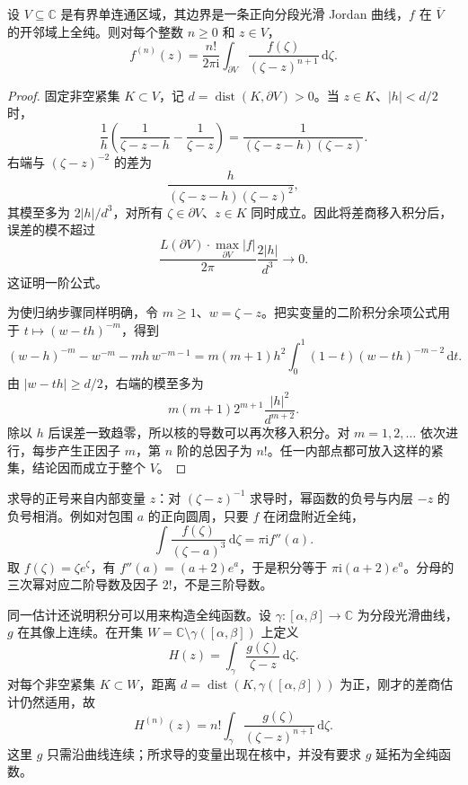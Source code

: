 \begin{proposition}\label{b3:prop:02-cauchy-derivatives}
设 \(V\subseteq\mathbb C\) 是有界单连通区域，其边界是一条正向分段光滑 Jordan 曲线，\(f\) 在 \(\overline V\) 的开邻域上全纯。则对每个整数 \(n\ge0\) 和 \(z\in V\)，
\[
 f^{(n)}(z)=\frac{n!}{2\pi\mathrm{i}}\int_{\partial V}
        \frac{f(\zeta)}{(\zeta-z)^{n+1}}\,\mathrm{d}\zeta.
\]
\end{proposition}
\begin{proof}
固定非空紧集 \(K\subset V\)，记 \(d=\operatorname{dist}(K,\partial V)>0\)。当 \(z\in K\)、\(|h|<d/2\) 时，
\[
 \frac1h\left(\frac1{\zeta-z-h}-\frac1{\zeta-z}\right)
 =\frac1{(\zeta-z-h)(\zeta-z)}.
\]
右端与 \((\zeta-z)^{-2}\) 的差为
\[
 \frac{h}{(\zeta-z-h)(\zeta-z)^2},
\]
其模至多为 \(2|h|/d^3\)，对所有 \(\zeta\in\partial V\)、\(z\in K\) 同时成立。因此将差商移入积分后，误差的模不超过
\[
 \frac{L(\partial V)\cdot\max_{\partial V}|f|}{2\pi}
       \frac{2|h|}{d^3}\longrightarrow0.
\]
这证明一阶公式。

为使归纳步骤同样明确，令 \(m\ge1\)、\(w=\zeta-z\)。把实变量的二阶积分余项公式用于 \(t\mapsto(w-th)^{-m}\)，得到
\[
 (w-h)^{-m}-w^{-m}-mh\,w^{-m-1}
 =m(m+1)h^2\int_0^1(1-t)(w-th)^{-m-2}\,\mathrm{d}t.
\]
由 \(|w-th|\ge d/2\)，右端的模至多为
\[
 m(m+1)2^{m+1}\frac{|h|^2}{d^{m+2}}.
\]
除以 \(h\) 后误差一致趋零，所以核的导数可以再次移入积分。对 \(m=1,2,\ldots\) 依次进行，每步产生正因子 \(m\)，第 \(n\) 阶的总因子为 \(n!\)。任一内部点都可放入这样的紧集，结论因而成立于整个 \(V\)。
\end{proof}

求导的正号来自内部变量 \(z\)：对 \((\zeta-z)^{-1}\) 求导时，幂函数的负号与内层 \(-z\) 的负号相消。例如对包围 \(a\) 的正向圆周，只要 \(f\) 在闭盘附近全纯，
\[
 \int\frac{f(\zeta)}{(\zeta-a)^3}\,\mathrm{d}\zeta
 =\pi\mathrm{i}f''(a).
\]
取 \(f(\zeta)=\zeta e^\zeta\)，有 \(f''(a)=(a+2)e^a\)，于是积分等于 \(\pi\mathrm{i}(a+2)e^a\)。分母的三次幂对应二阶导数及因子 \(2!\)，不是三阶导数。

\ProseParagraphBreak

同一估计还说明积分可以用来构造全纯函数。设 \(\gamma:[\alpha,\beta]\to\mathbb C\) 为分段光滑曲线，\(g\) 在其像上连续。在开集 \(W=\mathbb C\setminus\gamma([\alpha,\beta])\) 上定义
\[
 H(z)=\int_\gamma\frac{g(\zeta)}{\zeta-z}\,\mathrm{d}\zeta.
\]
对每个非空紧集 \(K\subset W\)，距离 \(d=\operatorname{dist}(K,\gamma([\alpha,\beta]))\) 为正，刚才的差商估计仍然适用，故
\[
 H^{(n)}(z)=n!\int_\gamma
          \frac{g(\zeta)}{(\zeta-z)^{n+1}}\,\mathrm{d}\zeta.
\]
这里 \(g\) 只需沿曲线连续；所求导的变量出现在核中，并没有要求 \(g\) 延拓为全纯函数。

